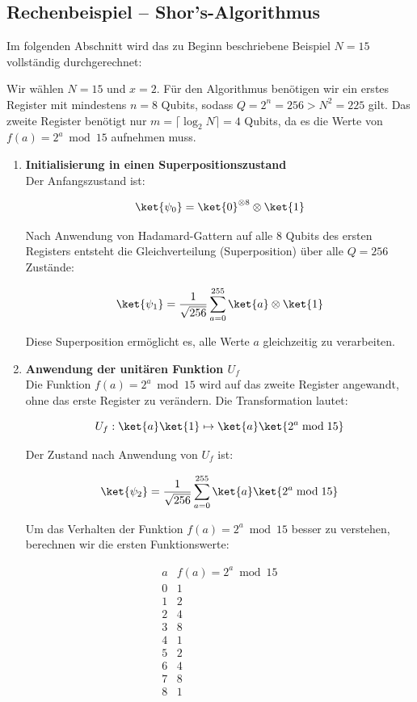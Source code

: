 \subsection{Rechenbeispiel – Shor's-Algorithmus}

Im folgenden Abschnitt wird das zu Beginn beschriebene Beispiel \( N = 15 \) vollständig durchgerechnet:

Wir wählen \( N = 15 \) und \( x = 2 \). Für den Algorithmus benötigen wir ein erstes Register mit mindestens \( n = 8 \) Qubits, sodass \( Q = 2^n = 256 > N^2 = 225 \) gilt. Das zweite Register benötigt nur \( m = \lceil \log_2 N \rceil = 4 \) Qubits, da es die Werte von \( f(a) = 2^a \bmod 15 \) aufnehmen muss.

\begin{enumerate}
    \item \textbf{Initialisierung in einen Superpositionszustand} \\
    Der Anfangszustand ist:

    \[
    \ket{\psi_0} = \ket{0}^{\otimes 8} \otimes \ket{1}
    \]

    Nach Anwendung von Hadamard-Gattern auf alle 8 Qubits des ersten Registers entsteht die Gleichverteilung (Superposition) über alle \( Q = 256 \) Zustände:

    \[
    \ket{\psi_1} = \frac{1}{\sqrt{256}} \sum_{a=0}^{255} \ket{a} \otimes \ket{1}
    \]

    Diese Superposition ermöglicht es, alle Werte \( a \) gleichzeitig zu verarbeiten.\\

    \item \textbf{Anwendung der unitären Funktion \( U_f \)} \\

    Die Funktion \( f(a) = 2^a \bmod 15 \) wird auf das zweite Register angewandt, ohne das erste Register zu verändern. Die Transformation lautet:

    \[
    U_f: \ket{a} \ket{1} \mapsto \ket{a} \ket{2^a \bmod 15}
    \]

    Der Zustand nach Anwendung von \( U_f \) ist:

    \[
    \ket{\psi_2} = \frac{1}{\sqrt{256}} \sum_{a=0}^{255} \ket{a} \ket{2^a \bmod 15}
    \]

    Um das Verhalten der Funktion \( f(a) = 2^a \bmod 15 \) besser zu verstehen, berechnen wir die ersten Funktionswerte:

    \[
    \begin{array}{c|c}
    a & f(a) = 2^a \bmod 15 \\
    \hline
    0 & 1 \\
    1 & 2 \\
    2 & 4 \\
    3 & 8 \\
    4 & 1 \\
    5 & 2 \\
    6 & 4 \\
    7 & 8 \\
    8 & 1 \\
    \end{array}
    \]


\end{enumerate}
